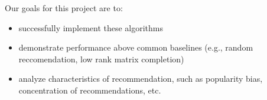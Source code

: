 \documentclass{article}
\begin{document}
Our goals for this project are to:
\begin{itemize}
  \item successfully implement these algorithms
  \item demonstrate performance above common baselines (e.g., random reccomendation,
  low rank matrix completion)  
  \item analyze characteristics of recommendation, such as popularity bias, 
concentration of recommendations, etc.  
\end{itemize} 

\newpage


\end{document}
